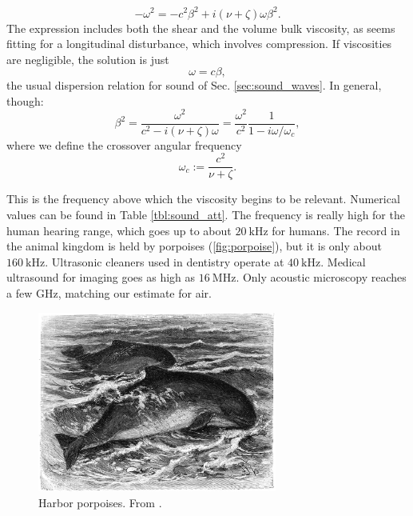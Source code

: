 \begin{equation}
  -\omega^2 = - c^2\beta^2 + i (\nu+\zeta)  \omega \beta^2 .
\end{equation}
The expression includes both the shear and the volume bulk viscosity,
as seems fitting for a longitudinal disturbance, which involves
compression. If viscosities are negligible, the solution is just
\[
\omega =  c \beta ,
\]
%
the usual dispersion relation for sound of
Sec. \ref{sec:sound_waves}. In general, though:
\begin{equation}
  \label{eq:waves_att_dispersion}
  \beta^2 =
  \frac{\omega^2}{c^2 - i(\nu+\zeta)\omega}=
  \frac{\omega^2}{c^2}\frac{1}{1 -  i\omega/\omega_c},
\end{equation}
where we define the crossover angular frequency 
\[
\omega_c := \frac{c^2}{\nu + \zeta }.
\]

This is the frequency above which the viscosity begins to be relevant.
Numerical values can be found in Table \ref{tbl:sound_att}. The
frequency is really high for the human hearing range, which goes up to
about $\SI{20}{\kilo\hertz}$ for humans. The record in the animal
kingdom is held by porpoises (\ref{fig:porpoise}), but it is only
about $\SI{160}{\kilo\hertz}$. Ultrasonic cleaners used in dentistry
operate at $\SI{40}{\kilo\hertz}$. Medical ultrasound for imaging goes
as high as $\SI{16}{\mega\hertz}$. Only acoustic microscopy
\cite{kp:AM} reaches a few \si{\giga\hertz}, matching our estimate for
air.


\begin{figure}
  \begin{center}
    \includegraphics[width=0.7\textwidth]{figures/porpoises}
  \end{center}
  \caption{Harbor porpoises. From \cite{Brehms_Tierleben}.  \label{fig:porpoises}}
\end{figure}


